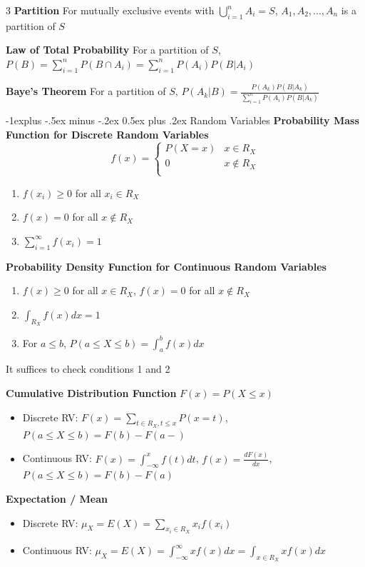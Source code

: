 \documentclass[10pt, landscape]{article}
\makeatletter
\renewcommand{\section}{\@startsection{section}{1}{0mm}%
                                {-1ex plus -.5ex minus -.2ex}%
                                {0.5ex plus .2ex}%
                                {\normalfont\large\bfseries}}
\renewcommand{\section}{\@startsection{section}{2}{0mm}%
                                {-1explus -.5ex minus -.2ex}%
                                {0.5ex plus .2ex}%
                                {\normalfont\normalsize\bfseries}}
\makeatother
\begin{document}
\begin{multicols*}{3}
\textbf{Partition} For mutually exclusive events with $\bigcup^n_{i=1}A_i=S$, $A_1,A_2,...,A_n$ is a partition of $S$

\textbf{Law of Total Probability} For a partition of $S$, $P(B)=\sum_{i=1}^nP(B \cap A_i)=\sum_{i=1}^nP(A_i)P(B|A_i)$

\textbf{Baye's Theorem} For a partition of $S$, $P(A_k|B)=\frac{P(A_k)P(B|A_k)}{\sum_{i=1}^nP(A_i)P(B|A_k)}$

\section{Random Variables}
\textbf{Probability Mass Function for Discrete Random Variables}
\[
f(x)=\begin{cases}
    P(X=x) & x \in R_X \\
    0 & x \notin R_X \\
    \end{cases}
\]
\begin{enumerate}
    \item $f(x_i) \geq 0$ for all $x_i \in R_X$
    \item $f(x)=0$ for all $x \notin R_X$
    \item $\sum_{i=1}^\infty f(x_i)=1$
\end{enumerate}

\textbf{Probability Density Function for Continuous Random Variables}
\begin{enumerate}
    \item $f(x) \geq 0$ for all $x \in R_X$, $f(x)=0$ for all $x \notin R_X$
    \item $\int_{R_X}f(x)dx=1$
    \item For $a \leq b$, $P(a \leq X \leq b)=\int_a^b f(x) dx$
\end{enumerate}
It suffices to check conditions 1 and 2

\textbf{Cumulative Distribution Function} $F(x)=P(X \leq x)$
\begin{itemize}
    \item Discrete RV: $F(x)=\sum_{t\in R_X, t \leq x}P(x=t)$, $P(a \leq X \leq b)=F(b)-F(a-)$
    \item Continuous RV: $F(x)=\int_{-\infty}^x f(t)dt$, $f(x)=\frac{dF(x)}{dx}$, $P(a \leq X \leq b) = F(b)-F(a)$
\end{itemize}

\textbf{Expectation / Mean}
\begin{itemize}
    \item Discrete RV:  $\mu_X=E(X)=\sum_{x_i\in R_X} x_if(x_i)$
    \item Continuous RV: $\mu_X=E(X)=\int_{-\infty}^{\infty}xf(x)dx=\int_{x\in R_X}xf(x)dx$
\end{itemize}


\end{multicols*}
\end{document}
